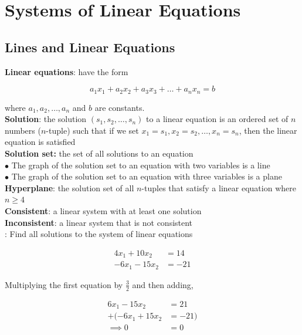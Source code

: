\section{Systems of Linear Equations}

    \subsection{Lines and Linear Equations}     %

        \textbf{Linear equations}: have the form

        \[
            a_1 x_1 + a_2 x_2 + a_3 x_3 + \dots + a_n x_n = b
        \]

        where $a_1, a_2, \dots, a_n$ and $b$ are constants. \\

        \textbf{Solution}: the solution $(s_1, s_2, \dots, s_n)$ to a linear equation is an ordered set of $n$ numbers ($n$-tuple) such that if we set $x_1 = s_1, x_2 = s_2, \dots, x_n = s_n$, then the linear equation
        is satisfied \\
        \textbf{Solution set:} the set of all solutions to an equation \\
        $\bullet$ The graph of the solution set to an equation with two variables is a line \\
        $\bullet$ The graph of the solution set to an equation with three variables is a plane \\

        \textbf{Hyperplane}: the solution set of all $n$-tuples that satisfy a linear equation where $n\geq 4$ \\
        \textbf{Consistent}: a linear system with at least one solution \\
        \textbf{Inconsistent}: a linear system that is not consistent \\

        \textit{}: Find all solutions to the system of linear equations

        \begin{align*}
            4x_1 + 10x_2    &= 14 \\
            -6x_1 - 15x_2   &= -21
        \end{align*}

        Multiplying the first equation by $\frac{3}{2}$ and then adding,

        \begin{align*}
            6x_1 - 15x_2    &= 21 \\
            +(-6x_1 + 15x_2 &= -21) \\
            \implies 0      &= 0
        \end{align*}

